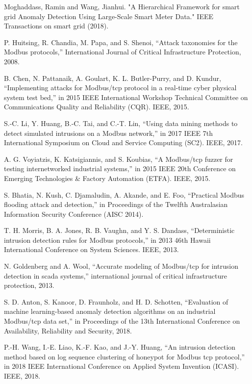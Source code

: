 \documentclass[letterpaper,10pt,conference]{IEEEtran}
\begin{document}
\begin{thebibliography}{00}

 Moghaddass, Ramin and Wang, Jianhui. "A Hierarchical Framework for smart grid Anomaly Detection Using Large-Scale Smart Meter Data." IEEE Transactions on smart grid (2018).

 P. Huitsing, R. Chandia, M. Papa, and S. Shenoi, “Attack taxonomies for
the Modbus protocols,” International Journal of Critical Infrastructure
Protection, 2008.



 B. Chen, N. Pattanaik, A. Goulart, K. L. Butler-Purry, and D. Kundur,
“Implementing attacks for Modbus/tcp protocol in a real-time cyber
physical system test bed,” in 2015 IEEE International Workshop Technical
Committee on Communications Quality and Reliability (CQR).
IEEE, 2015.


S.-C. Li, Y. Huang, B.-C. Tai, and C.-T. Lin, “Using data mining
methods to detect simulated intrusions on a Modbus network,” in 2017
IEEE 7th International Symposium on Cloud and Service Computing
(SC2). IEEE, 2017.


 A. G. Voyiatzis, K. Katsigiannis, and S. Koubias, “A Modbus/tcp
fuzzer for testing internetworked industrial systems,” in 2015 IEEE 20th
Conference on Emerging Technologies \& Factory Automation (ETFA).
IEEE, 2015.



S. Bhatia, N. Kush, C. Djamaludin, A. Akande, and E. Foo, “Practical
Modbus flooding attack and detection,” in Proceedings of the Twelfth
Australasian Information Security Conference (AISC 2014).


T. H. Morris, B. A. Jones, R. B. Vaughn, and Y. S. Dandass, “Deterministic
intrusion detection rules for Modbus protocols,” in 2013 46th
Hawaii International Conference on System Sciences. IEEE, 2013.

N. Goldenberg and A. Wool, “Accurate modeling of Modbus/tcp for
intrusion detection in scada systems,” international journal of critical
infrastructure protection, 2013.


S. D. Anton, S. Kanoor, D. Fraunholz, and H. D. Schotten, “Evaluation
of machine learning-based anomaly detection algorithms on an industrial
Modbus/tcp data set,” in Proceedings of the 13th International Conference
on Availability, Reliability and Security, 2018.


 P.-H. Wang, I.-E. Liao, K.-F. Kao, and J.-Y. Huang, “An intrusion detection
method based on log sequence clustering of honeypot for Modbus
tcp protocol,” in 2018 IEEE International Conference on Applied System
Invention (ICASI). IEEE, 2018.



\end{thebibliography}
\end{document}
